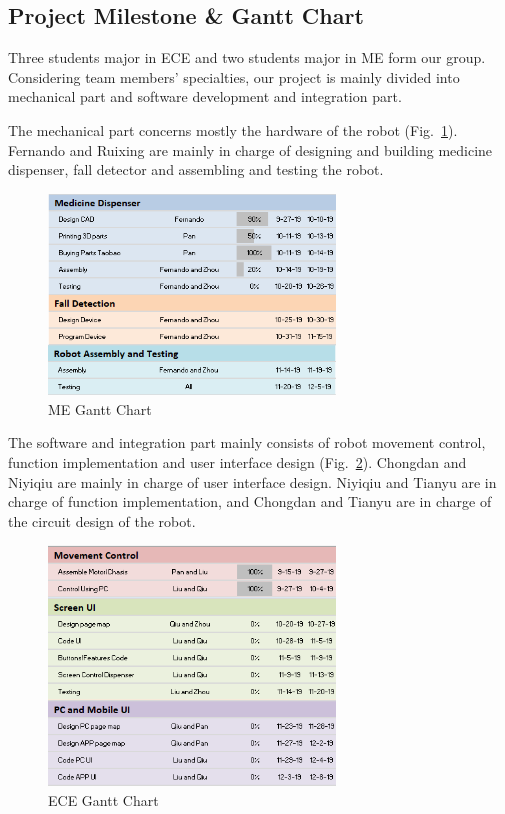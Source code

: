 \documentclass[12pt]{article}
\begin{document}
\subsection{Project Milestone \& Gantt Chart}
Three students major in ECE and two students major in ME form our group. Considering team members' specialties, our project is mainly divided into mechanical part and software development and integration part.\par 
The mechanical part concerns mostly the hardware of the robot (Fig.~\ref{fig::megantt}). Fernando and Ruixing are mainly in charge of designing and building medicine dispenser, fall detector and assembling and testing the robot.\par
\begin{figure}[H]
	
	\centering
	\includegraphics[width=3in]{ganttA.png}
	\caption{ME Gantt Chart}
	\label{fig::megantt}

\end{figure}
The software and integration part mainly consists of robot movement control, function implementation and user interface design (Fig.~\ref{fig::ecegantt}). Chongdan and Niyiqiu are mainly in charge of user interface design. Niyiqiu and Tianyu are in charge of function implementation, and Chongdan and Tianyu are in charge of the circuit design of the robot.
\begin{figure}[H]
	
	\centering
	\includegraphics[width=3in]{ganttB.png}
	\caption{ECE Gantt Chart}
	\label{fig::ecegantt}

\end{figure}
\end{document}
